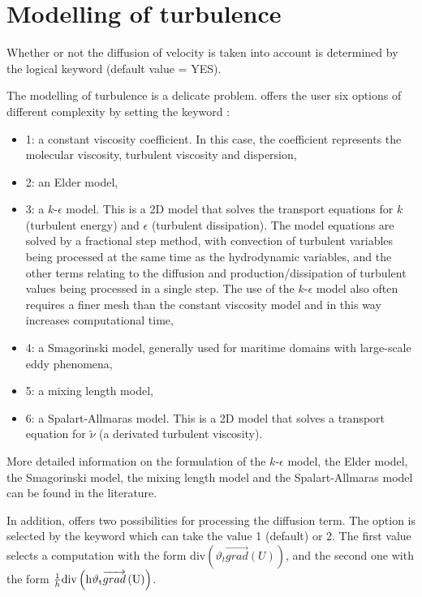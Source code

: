 \section{Modelling of turbulence}
\label{sec:mod:turbul}
Whether or not the diffusion of velocity is taken into account is determined
by the logical keyword  (default value = YES).

The modelling of turbulence is a delicate problem.
 offers the user six options of different complexity by setting
the keyword :
\begin{itemize}
\item 1: a constant viscosity coefficient.
In this case, the coefficient represents the molecular viscosity,
turbulent viscosity and dispersion,

\item 2: an Elder model,

\item 3: a $k$-$\epsilon$ model.
This is a 2D model that solves the transport equations for $k$ (turbulent energy)
and $\epsilon$ (turbulent dissipation).
The model equations are solved by a fractional step method, with convection of
turbulent variables being processed at the same time as the hydrodynamic
variables, and the other terms relating to the diffusion and
production/dissipation of turbulent values being processed in a single step.
The use of the $k$-$\epsilon$ model also often requires a finer mesh
than the constant viscosity model and in this way increases computational time,

\item 4: a Smagorinski model, generally used for maritime
domains with large-scale eddy phenomena,

\item 5: a mixing length model,

\item 6: a Spalart-Allmaras model.
This is a 2D model that solves a transport equation for $\tilde{\nu}$
(a derivated turbulent viscosity).

\end{itemize}

More detailed information on the formulation of the $k$-$\epsilon$ model,
the Elder model, the Smagorinski model, the mixing length model and the
Spalart-Allmaras model can be found in the literature.

In addition,  offers two possibilities for processing the diffusion
term.
The option is selected by the keyword
which can take the value 1 (default) or 2.
The first value selects a computation with the form
div$\left({\vartheta }_t\overrightarrow{grad}\left(U\right)\right)$,
and the second one with the form
$\frac{1}{h}\rm{div}\left({h\vartheta_t }\overrightarrow{grad}\left(U\right)\right)$.

